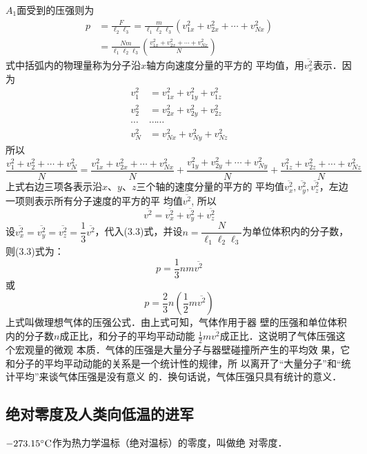 $A_1$面受到的压强则为
\begin{equation}
    \begin{split}
 p&=\frac{F}{\ell_2\ell_3}=\frac{m}{\ell_1\ell_2\ell_3}\left(v^2_{1x}+v^2_{2x}+\cdots+v^2_{Nx}\right)\\
 &=\frac{Nm}{\ell_1\ell_2\ell_3} \left(\frac{v^2_{1x}+v^2_{2x}+\cdots+v^2_{Nx}}{N}\right)      
    \end{split}
\end{equation}
式中括弧内的物理量称为分子沿$x$轴方向速度分量的平方的
平均值，用$\overline{v^2_x}$表示．因为
\[\begin{split}
{v}_{1}^{2}&=v_{1 x}^{2}+v_{1 y}^{2}+v_{1 z}^{2} \\
{v}_{2}^{2}&=v_{2 x}^{2}+v_{2 y}^{2}+v_{2 z}^{2} \\
\cdots& \cdots \cdots \\
{v}_{N}^{2}&=v_{N x}^{2}+v_{N y}^{2}+v_{N z}^{2}  
\end{split}\]
所以
\[\frac{v_{1}^{2}+v_{2}^{2}+\cdots+v_{N}^{2}}{N}= \frac{v_{1 x}^{2}+v_{2 x}^{2}+\cdots+v_{N x}^{2}}{N}+\frac{v_{1 y}^{2}+v_{2 y}^{2}+\cdots+v_{N y}^{2}}{N} +\frac{v_{1 z}^{2}+v_{2 z}^{2}+\cdots+v_{N z}^{2}}{N}\]
上式右边三项各表示沿$x$、$y$、$z$三个轴的速度分量的平方的
平均值$\overline{v^2_x},\overline{v^2_y},\overline{v^2_z}$，左边一项则表示所有分子速度的平方的平
均值$\overline{v^2}$, 所以
\[\overline{v^2}=\overline{v^2_x}+\overline{v^2_y}+\overline{v^2_z}\]
设$\overline{v^2_x}=\overline{v^2_y}=\overline{v^2_z}=\dfrac{1}{3}\overline{v^2}$，代入(3.3)式，并设$n=\dfrac{N}{\ell_1\ell_2\ell_3}$为单位体积内的分子数，则(3.3)式为：
\[p=\frac{1}{3}nm\overline{v^2}\]
或
\begin{equation}
    p=\frac{2}{3}n\left(\frac{1}{2}m\overline{v^2}\right)
\end{equation}
上式叫做理想气体的压强公式．由上式可知，气体作用于器
壁的压强和单位体积内的分子数$n$成正比，和分子的平均平动动能
$\frac{1}{2}m\overline{v^2}$成正比．这说明了气体压强这个宏观量的微观
本质．气体的压强是大量分子与器壁碰撞所产生的平均效
果，它和分子的平均平动动能的关系是一个统计性的规律，所
以离开了“大量分子”和“统计平均”来谈气体压强是没有意义
的．换句话说，气体压强只具有统计的意义．



\subsection{绝对零度及人类向低温的进军}
$-273.15^{\circ}{\rm C}$作为热力学温标（绝对温标）的零度，叫做绝
对零度．

